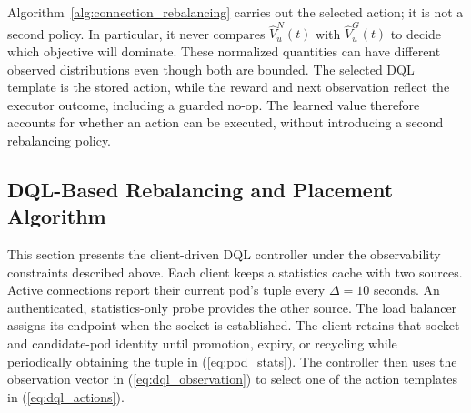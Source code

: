 \documentclass[manuscript]{acmart}
\begin{document}
Algorithm~\ref{alg:connection_rebalancing} carries out the selected action;
it is not a second policy. In particular, it never compares
$\widehat{V}^N_u(t)$ with $\widehat{V}^G_u(t)$ to decide which objective will
dominate. These normalized quantities can have different observed
distributions even though both are bounded. The selected DQL template is the
stored action, while the reward and next observation reflect the executor
outcome, including a guarded no-op. The learned value therefore accounts for whether an action can be executed,
without introducing a second rebalancing policy.


\subsection{DQL-Based Rebalancing and Placement Algorithm}
This section presents the client-driven DQL controller under the observability
constraints described above. Each client keeps a statistics cache with two sources.
Active connections report their current pod's tuple every $\Delta=10$ seconds.
An authenticated, statistics-only probe provides the other source. The load
balancer assigns its endpoint when the socket is established. The
client retains that socket and candidate-pod identity until promotion, expiry,
or recycling while periodically obtaining the tuple in (\ref{eq:pod_stats}). The controller then
uses the observation vector in (\ref{eq:dql_observation}) to select one of the
action templates in (\ref{eq:dql_actions}).
\end{document}
